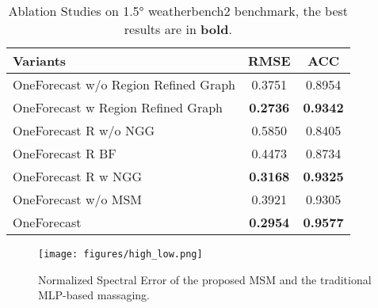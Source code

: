 \begin{table}[t]
    \caption{Ablation Studies on 1.5° weatherbench2 benchmark, the best results are in \textbf{bold}.}
    \small
    \label{tab:ablation}
    \vspace{-3pt}
    \vskip 0.13in
    \centering
    \begin{small}
        \begin{sc}
            \renewcommand{\multirowsetup}{\centering}
            \setlength{\tabcolsep}{1.1pt} %
            \begin{tabular}{l|cc}
                \toprule
                Variants                             & RMSE & ACC \\ 
                \midrule
                OneForecast w/o Region Refined Graph &0.3751      &0.8954     \\
                OneForecast w Region Refined Graph   &\textbf{0.2736}      &\textbf{0.9342}\\ 
                \midrule
                OneForecast R w/o NGG                &0.5850      &0.8405     \\
                OneForecast R BF                     &0.4473      &0.8734     \\
                OneForecast R w NGG                  &\textbf{0.3168}      &\textbf{0.9325}     \\ 
                \midrule
                OneForecast w/o MSM                  &0.3921      &0.9305     \\
                OneForecast                          &\textbf{0.2954}      &\textbf{0.9577}     \\
                \bottomrule
            \end{tabular}
        \end{sc}
    \end{small}
\vspace{-2mm}
\end{table}

\begin{figure}[h]
\centering
\texttt{[image: figures/high\_low.png]}
\vspace{-6pt}
\caption{Normalized Spectral Error of the proposed MSM and the traditional MLP-based massaging.}
\label{fig:high_low}
\vspace{-4mm}
\end{figure}
